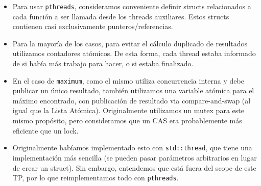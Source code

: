 \begin{itemize}

	\item Para usar \texttt{pthreads}, consideramos conveniente definir structs relacionados a cada función a ser llamada desde los threads auxiliares. Estos structs contienen casi exclusivamente punteros/referencias.

	\item Para la mayoría de los casos, para evitar el cálculo duplicado de resultados utilizamos contadores atómicos. De esta forma, cada thread estaba informado de si había más trabajo para hacer, o si estaba finalizado.

	\item En el caso de \texttt{maximum}, como el mismo utiliza concurrencia interna y debe publicar un único resultado, también utilizamos una variable atómica para el máximo encontrado, con publicación de resultado via compare-and-swap (al igual que la Lista Atómica). Originalmente utilizamos un mutex para este mismo propósito, pero consideramos que un CAS era probablemente más eficiente que un lock.

	\item Originalmente habíamos implementado esto con \texttt{std::thread}, que tiene una implementación más sencilla (se pueden pasar parámetros arbitrarios en lugar de crear un struct). Sin embargo, entendemos que está fuera del scope de este TP, por lo que reimplementamos todo con \texttt{pthreads}.

\end{itemize}